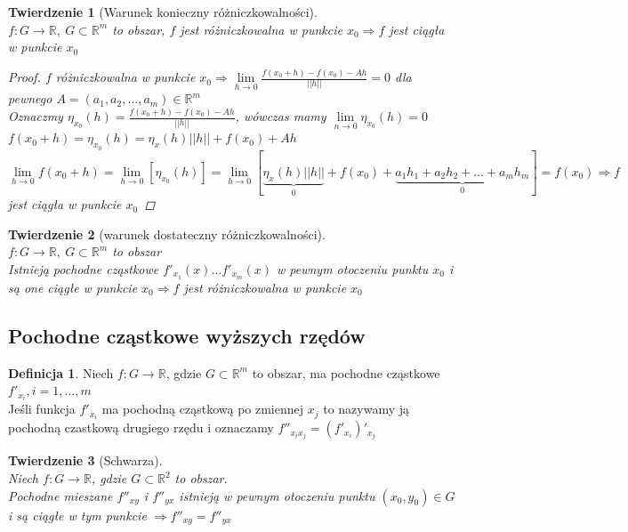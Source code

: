 \documentclass[12pt,a4paper]{article}
\newtheorem{tw}{Twierdzenie}
\theoremstyle{definition}
\newtheorem{df}{Definicja}
\begin{document}

\begin{tw}[Warunek konieczny różniczkowalności]~\\
$f:G\to\mathbb{R}, ~ G\subset\mathbb{R}^m$ to obszar, $f$ jest różniczkowalna w punkcie $x_0 \Rightarrow f$ jest ciągła w punkcie $x_0$
\begin{proof}
$f$ różniczkowalna w punkcie $x_0 \Rightarrow \lim\limits_{h\to 0}\frac{f(x_0+h)-f(x_0)-Ah}{||h||}=0$ dla pewnego $A=(a_1,a_2, \dots, a_m) \in \mathbb{R}^m$\\
Oznaczmy $\eta_{x_0}(h) = \frac{f(x_0+h)-f(x_0)-Ah}{||h||}$, wówczas mamy $\lim\limits_{n\to 0}\eta_{x_0}(h) = 0$\\
$f(x_0+h)=\eta_{x_0}(h) = \eta_x(h)||h|| + f(x_0) + Ah$\\
$\lim\limits_{h\to 0}f(x_0+h) = \lim\limits_{h\to 0}[\eta_{x_0}(h)] = \lim\limits_{h\to 0}[\underbrace{\eta_x(h)||h||}_{0} + f(x_0) + \underbrace{a_1h_1 + a_2h_2 + \dots + a_mh_m}_{0}] = f(x_0) \Rightarrow f$ jest ciągła w punkcie $x_0$
\end{proof}
\end{tw}

\begin{tw}[warunek dostateczny różniczkowalności]~\\
$f: G\to\mathbb{R}, ~ G\subset \mathbb{R}^m$ to obszar\\
Istnieją pochodne cząstkowe $f'_{x_1}(x)\dots f'_{x_m}(x)$ w pewnym otoczeniu punktu $x_0$ i są one ciągłe w punkcie $x_0 \Rightarrow f$ jest różniczkowalna w punkcie $x_0$
\end{tw}

\subsection{Pochodne cząstkowe wyższych rzędów}
\begin{df}
Niech $f: G\to\mathbb{R}$, gdzie $G\subset \mathbb{R}^m$ to obszar, ma pochodne cząstkowe $f'_{x_i}, i=1,\dots , m$\\
Jeśli funkcja $f'_{x_i}$ ma pochodną cząstkową po zmiennej $x_j$ to nazywamy ją pochodną czastkową drugiego rzędu i oznaczamy $f''_{x_ix_j} = (f'_{x_i})'_{x_j}$
\end{df}

\begin{tw}[Schwarza]~\\
Niech $f: G\to\mathbb{R}$, gdzie $G\subset \mathbb{R}^2$ to obszar.\\
Pochodne mieszane $f''_{xy}$ i $f''_{yx}$ istnieją w pewnym otoczeniu punktu $(x_0, y_0)\in G$ i są ciągłe w tym punkcie $\Rightarrow f''_{xy} = f''_{yx}$
\end{tw}
\end{document}
